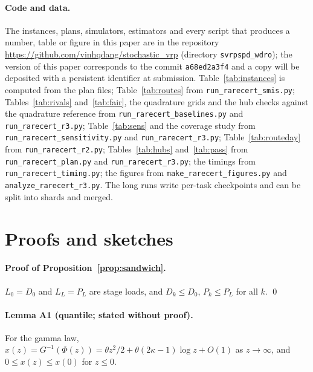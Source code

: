 \documentclass[11pt]{article}
\theoremstyle{definition}
\theoremstyle{remark}
\begin{document}
{\sloppy\paragraph{Code and data.} The instances, plans, simulators, estimators and
every script that produces a number, table or figure in this paper are in the
repository \url{https://github.com/vinhqdang/stochastic_vrp} (directory
\texttt{svrpspd\_wdro}); the version of this paper corresponds to the commit
\texttt{a68ed2a3f4} and a copy will be deposited with a persistent identifier at
submission. Table~\ref{tab:instances} is computed from the plan files;
Table~\ref{tab:routes} from \texttt{run\_rarecert\_smis.py};
Tables~\ref{tab:rivals} and~\ref{tab:fair}, the quadrature grids and the
hub checks against the quadrature reference from \texttt{run\_rarecert\_baselines.py} and
\texttt{run\_rarecert\_r3.py}; Table~\ref{tab:sens} and the coverage study
from \texttt{run\_rarecert\_sensitivity.py} and \texttt{run\_rarecert\_r3.py};
Table~\ref{tab:routeday} from \texttt{run\_rarecert\_r2.py};
Tables~\ref{tab:hubs} and~\ref{tab:pass} from
\texttt{run\_rarecert\_plan.py} and \texttt{run\_rarecert\_r3.py}; the timings
from \texttt{run\_rarecert\_timing.py}; the figures from
\texttt{make\_rarecert\_figures.py} and \texttt{analyze\_rarecert\_r3.py}. The long
runs write per-task checkpoints and can be split into shards and merged.

\appendix
\section{Proofs and sketches}
\label{app:proofs}

\paragraph{Proof of Proposition~\ref{prop:sandwich}.} $L_0 = D_0$ and $L_L = P_L$
are stage loads, and $D_k\le D_0$, $P_k\le P_L$ for all $k$. \qed

\paragraph{Lemma A1 (quantile; stated without proof).} For the gamma law,
$x(z) = G^{-1}(\Phi(z)) = \theta z^2/2 + \theta(2\kappa-1)\log z + O(1)$ as
$z\to\infty$, and $0\le x(z)\le x(0)$ for $z\le 0$.

}
\end{document}
